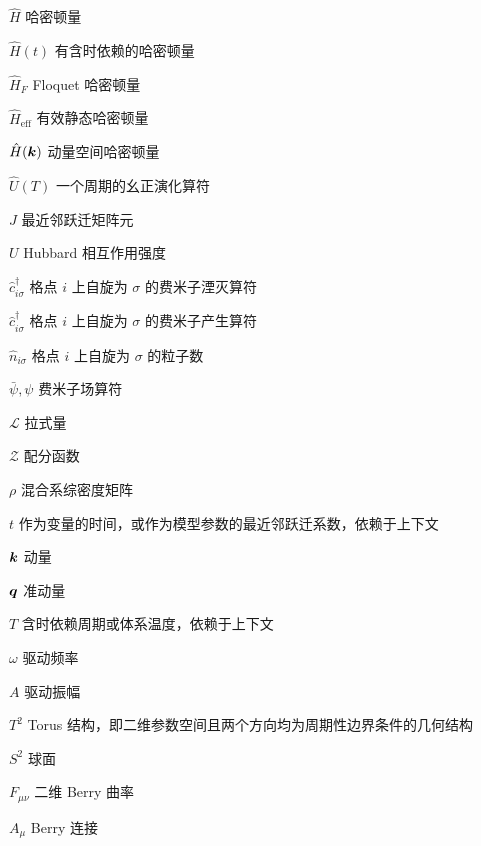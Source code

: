 \begin{denotation}[3cm]
\item[$\hat{H}$] 哈密顿量
\item[$\hat{H}(t)$] 有含时依赖的哈密顿量
\item[$\hat{H}_F$] Floquet 哈密顿量
\item[$\hat{H}_{\text{eff}}$] 有效静态哈密顿量
\item[$\hat{H}(\boldsymbol{k})$] 动量空间哈密顿量
\item[$\hat{U}(T)$] 一个周期的幺正演化算符
\item[$J$] 最近邻跃迁矩阵元
\item[$U$] Hubbard 相互作用强度
\item[$\hat{c}^{\dagger}_{i\sigma}$] 格点 $i$ 上自旋为 $\sigma$ 的费米子湮灭算符
\item[$\hat{c}^{\dagger}_{i\sigma}$] 格点 $i$ 上自旋为 $\sigma$ 的费米子产生算符
\item[$\hat{n}_{i\sigma}$] 格点 $i$ 上自旋为 $\sigma$ 的粒子数
\item[$\bar\psi, \psi$] 费米子场算符
\item[$\mathcal{L}$] 拉式量
\item[$\mathcal{Z}$] 配分函数
\item[$\rho$] 混合系综密度矩阵
\item[$t$] 作为变量的时间，或作为模型参数的最近邻跃迁系数，依赖于上下文
\item[$\boldsymbol{k}$] 动量
\item[$\boldsymbol{q}$] 准动量
\item[$T$] 含时依赖周期或体系温度，依赖于上下文
\item[$\omega$] 驱动频率
\item[$A$] 驱动振幅
\item[$T^2$] Torus 结构，即二维参数空间且两个方向均为周期性边界条件的几何结构
\item[$S^2$] 球面
\item[$F_{\mu\nu}$] 二维 Berry 曲率
\item[$A_{\mu}$] Berry 连接
\end{denotation}





